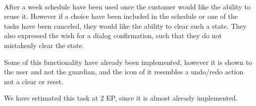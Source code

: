 \begin{description}[style=unboxed]
    \item[{[}\phigh{]} Week Schedule -- Clear Progress] \hfill \\ 
    After a week schedule have been used once the customer would like the ability to reuse it. 
    However if a choice have been included in the schedule or one of the tasks have been canceled, they would like the ability to clear such a state. 
    They also expressed the wish for a dialog confirmation, such that they do not mistakenly clear the state.

    Some of this functionality have already been implemented, however it is shown to the user and not the guardian, and the icon of it resembles a undo/redo action not a clear or reset. 

    We have estimated this task at 2 EP, since it is almost already implemented. 
\end{description}
